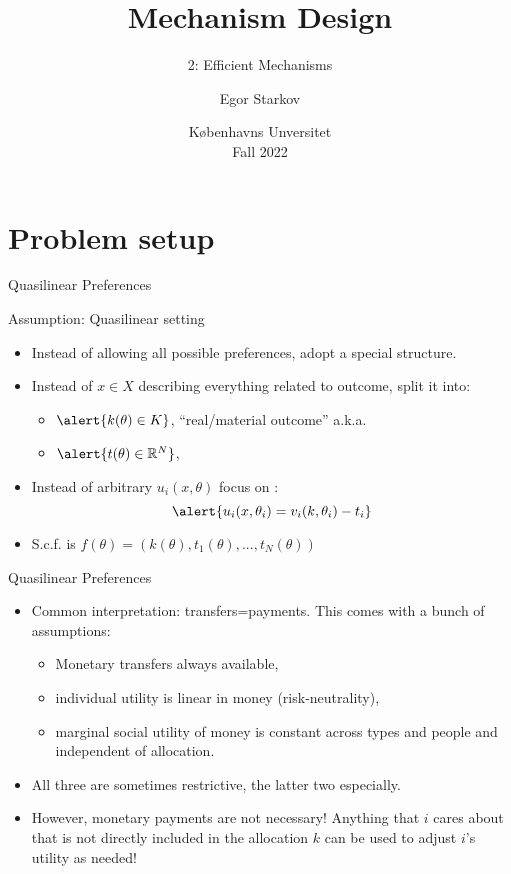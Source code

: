 \documentclass[english,10pt
,aspectratio=169
,handout
]{beamer}
\title{Mechanism Design}
\subtitle{2: Efficient Mechanisms}
\author{Egor Starkov}
\date{K{\o}benhavns Unversitet \\
	Fall 2022}
\begin{document}
	\frame[plain]{\titlepage}



\section{Problem setup}

\begin{frame}{Quasilinear Preferences}
	\begin{alertblock}{Assumption: Quasilinear setting}
		\begin{itemize}
			\item Instead of allowing all possible preferences, adopt a special structure.
			\item Instead of $x \in X$ describing everything related to outcome, split it into:
			\begin{itemize}
				\item $\alert{k(\theta) \in K}$, ``real/material outcome'' a.k.a. 
				\item $\alert{t(\theta) \in \mathbb{R}^N}$, 
			\end{itemize}
			\item Instead of arbitrary $u_i(x,\theta)$ focus on :
			$$\alert{ u_i(x,\theta_i) = v_i(k,\theta_i) - t_i }$$
			\vspace{-1em}
			\item S.c.f. is $f(\theta) = \left( k(\theta), t_1(\theta), ..., t_N(\theta) \right)$
		\end{itemize}
	\end{alertblock}
\end{frame}


\begin{frame}{Quasilinear Preferences}
\begin{itemize}
	\item Common interpretation: transfers=payments. This comes with a bunch of assumptions:
	\begin{itemize}
		\item Monetary transfers always available,
		\item individual utility is linear in money (risk-neutrality),
		\item marginal social utility of money is constant across types and people and independent of allocation.
	\end{itemize}
	\item All three are sometimes restrictive, the latter two especially. 
	\item However, monetary payments are not necessary! Anything that $i$ cares about that is not directly included in the allocation $k$ can be used to adjust $i$'s utility as needed!
\end{itemize}
\end{frame}
\end{document}
